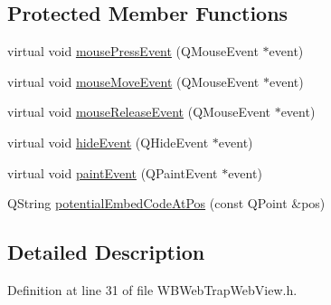 \subsection*{Protected Member Functions}
\begin{DoxyCompactItemize}
\item 
virtual void \hyperlink{class_w_b_web_trap_web_view_aee781ab6308411f503aff112b4d5c6c9}{mouse\-Press\-Event} (Q\-Mouse\-Event $\ast$event)
\item 
virtual void \hyperlink{class_w_b_web_trap_web_view_a405fcd2faa0d0fef3666cd4e7c5c4600}{mouse\-Move\-Event} (Q\-Mouse\-Event $\ast$event)
\item 
virtual void \hyperlink{class_w_b_web_trap_web_view_a40453b8f1b1ca67ee79c4874f4b15586}{mouse\-Release\-Event} (Q\-Mouse\-Event $\ast$event)
\item 
virtual void \hyperlink{class_w_b_web_trap_web_view_a0b5c598bc4422e4718b7d6c203b46ce2}{hide\-Event} (Q\-Hide\-Event $\ast$event)
\item 
virtual void \hyperlink{class_w_b_web_trap_web_view_a5c5ea8a2fe809c4b4f40fa40847018c7}{paint\-Event} (Q\-Paint\-Event $\ast$event)
\item 
Q\-String \hyperlink{class_w_b_web_trap_web_view_a6614aee6468aa24bc5b14051524210ff}{potential\-Embed\-Code\-At\-Pos} (const Q\-Point \&pos)
\end{DoxyCompactItemize}


\subsection{Detailed Description}


Definition at line 31 of file W\-B\-Web\-Trap\-Web\-View.\-h.



